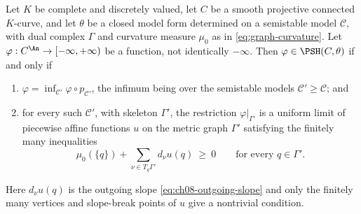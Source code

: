 \begin{proposition}
\label{prop:ch21-curve-criterion}
Let \(K\) be complete and discretely valued, let \(C\) be a smooth
projective connected \(K\)-curve, and let \(\theta\) be a closed model form
determined on a semistable model \(\mathcal C\), with dual complex
\(\Gamma\) and curvature measure \(\mu_0\) as in
\eqref{eq:graph-curvature}.  Let
\(\varphi:C^{\An}\to[-\infty,+\infty)\) be a function, not identically
\(-\infty\).  Then \(\varphi\in\PSH(C,\theta)\) if and only if
\begin{enumerate}
\item\label{itm:ch21-cc:inf}
\(\varphi=\inf_{\mathcal C'}\varphi\circ p_{\mathcal C'}\), the infimum
being over the semistable models \(\mathcal C'\geq\mathcal C\); and
\item\label{itm:ch21-cc:pl}
for every such \(\mathcal C'\), with skeleton \(\Gamma'\), the restriction
\(\varphi|_{\Gamma'}\) is a uniform limit of piecewise affine functions
\(u\) on the metric graph \(\Gamma'\) satisfying the finitely many
inequalities
\begin{equation}
\label{eq:ch21-curve-vertex-inequalities}
 \mu_0(\{q\})+\sum_{\nu\in T_q\Gamma'}d_\nu u(q)\ \geq\ 0
 \qquad\text{for every }q\in\Gamma' .
\end{equation}
\end{enumerate}
Here \(d_\nu u(q)\) is the outgoing slope \eqref{eq:ch08-outgoing-slope} and
only the finitely many vertices and slope-break points of \(u\) give a
nontrivial condition.
\end{proposition}

